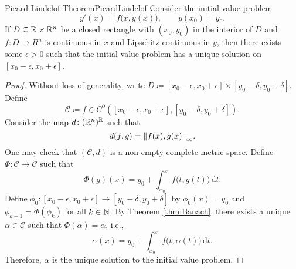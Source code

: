 \documentclass[math, code]{amznotes}
\theoremstyle{remark}
\renewcommand{\d}{\mathrm{d}}
\begin{document}
\begin{thmbox}{Picard-Lindel\"{o}f Theorem}{PicardLindelof}
    Consider the initial value problem 
    \begin{equation*}
        y'(x) = f\bigl(x, y(x)\bigr), \qquad y(x_0) = y_0.
    \end{equation*} 
    If $D \subseteq \mathbb{R} \times \mathbb{R}^n$ be a closed rectangle with $(x_0, y_0)$ in the interior of $D$ and $f \colon D \to R^n$ is continuous in $x$ and Lipschitz continuous in $y$, then there exists some $\epsilon > 0$ such that the initial value problem has a unique solution on $[x_0 - \epsilon, x_0 + \epsilon]$.
    \tcblower
    \begin{proof}
        Without loss of generality, write $D \coloneqq [x_0 - \epsilon, x_0 + \epsilon] \times [y_0 - \delta, y_0 + \delta]$. Define 
        \begin{equation*}
            \mathcal{C} \coloneqq f \in C^0([x_0 - \epsilon, x_0 + \epsilon], [y_0 - \delta, y_0 + \delta]).
        \end{equation*}
        Consider the map $d \colon (\mathbb{R}^n)^{\mathbb{R}}$ such that 
        \begin{equation*}
            d(f, g) = {\left\lVert {f(x), g(x)} \right\rVert}_{\infty}.
        \end{equation*}
        One may check that $\left(\mathcal{C}, d\right)$ is a non-empty complete metric space. Define $\Phi \colon \mathcal{C} \to \mathcal{C}$ such that 
        \begin{equation*}
            \Phi(g)(x) = y_0 + \int_{x_0}^x\!f\bigl(t, g(t)\bigr)\,\d t.
        \end{equation*}
        Define $\phi_0 \colon [x_0 - \epsilon, x_0 + \epsilon] \to [y_0 - \delta, y_0 + \delta]$ by $\phi_0(x) = y_0$ and $\phi_{k + 1} = \Phi(\phi_k)$ for all $k \in \mathbb{N}$. By Theorem \ref{thm:Banach}, there exists a unique $\alpha \in \mathcal{C}$ such that $\Phi(\alpha) = \alpha$, i.e.,
        \begin{equation*}
            \alpha(x) = y_0 + \int_{x_0}^x\!f\bigl(t, \alpha(t)\bigr)\,\d t.
        \end{equation*}
        Therefore, $\alpha$ is the unique solution to the initial value problem.
    \end{proof}
\end{thmbox}
\end{document}
